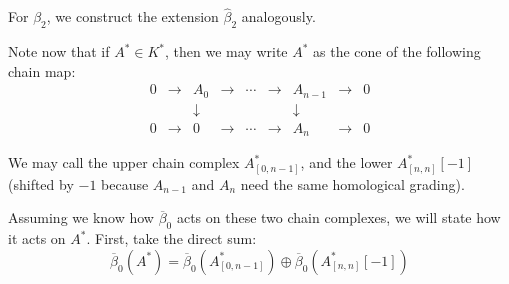 For $\beta_2$, we construct the extension $\widehat{\beta}_2$ analogously.

Note now that if $A^* \in K^*$, then we may write $A^*$ as the cone of the following chain map:
$$\begin{array}{ccccccccc}
0 & \to & A_0 & \to & \cdots & \to & A_{n-1} & \to & 0 \\
  &     & \downarrow & & & & \downarrow & & \\
0 & \to & 0   & \to & \cdots & \to & A_n     & \to & 0
\end{array}$$

We may call the upper chain complex $A^*_{[0,n-1]}$, and the lower $A^*_{[n,n]}[-1]$ (shifted by $-1$ because $A_{n-1}$ and $A_n$ need the same homological grading).

Assuming we know how $\overline{\beta}_0$ acts on these two chain complexes, we will state how it acts on $A^*$. First, take the direct sum:
$$\overline{\beta}_0(A^*) = \overline{\beta}_0(A^*_{[0,n-1]}) \oplus \overline{\beta}_0(A^*_{[n,n]}[-1])$$
